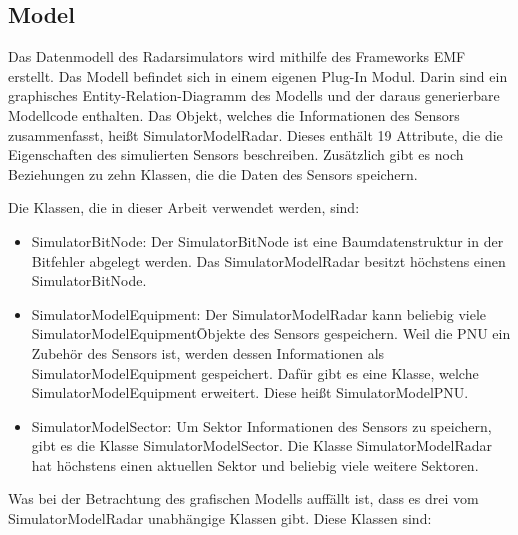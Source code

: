 \subsection{Model}


Das Datenmodell des Radarsimulators wird mithilfe des Frameworks EMF erstellt. Das Modell befindet sich in einem eigenen Plug-In Modul. Darin sind ein graphisches Entity-Relation-Diagramm des Modells und der daraus generierbare Modellcode enthalten. Das Objekt, welches die Informationen des Sensors zusammenfasst, heißt SimulatorModelRadar. Dieses enthält 19 Attribute, die die Eigenschaften des simulierten Sensors beschreiben. Zusätzlich gibt es noch Beziehungen zu zehn Klassen, die die Daten des Sensors speichern. 

Die Klassen, die in dieser Arbeit verwendet werden, sind:

\begin{itemize}
    \item SimulatorBitNode: Der SimulatorBitNode ist eine Baumdatenstruktur in der Bitfehler abgelegt werden. Das SimulatorModelRadar besitzt höchstens einen SimulatorBitNode.
    \item SimulatorModelEquipment: Der SimulatorModelRadar kann beliebig viele    SimulatorModelEquipment\=Objekte des Sensors gespeichern. Weil die PNU ein Zubehör des Sensors ist, werden dessen Informationen als SimulatorModelEquipment gespeichert. Dafür gibt es eine Klasse, welche SimulatorModelEquipment erweitert. Diese heißt SimulatorModelPNU.
    \item SimulatorModelSector: Um Sektor Informationen des Sensors zu speichern, gibt es die Klasse SimulatorModelSector. Die Klasse SimulatorModelRadar hat höchstens einen aktuellen Sektor und beliebig viele weitere Sektoren.    
\end{itemize}

Was bei der Betrachtung des grafischen Modells auffällt ist, dass es drei vom SimulatorModelRadar unabhängige Klassen gibt. Diese Klassen sind:

